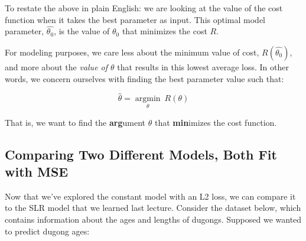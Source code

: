 \documentclass[
  letterpaper,
  DIV=11,
  numbers=noendperiod]{scrreprt}
\begin{document}
To restate the above in plain English: we are looking at the value of
the cost function when it takes the best parameter as input. This
optimal model parameter, \(\hat{\theta_0}\), is the value of
\(\theta_0\) that minimizes the cost \(R\).

For modeling purposes, we care less about the minimum value of cost,
\(R(\hat{\theta_0})\), and more about the \emph{value of \(\theta\)}
that results in this lowest average loss. In other words, we concern
ourselves with finding the best parameter value such that:

\[\hat{\theta} = \underset{\theta}{\operatorname{\arg\min}}\:R(\theta)\]

That is, we want to find the \textbf{arg}ument \(\theta\) that
\textbf{min}imizes the cost function.

\subsection{Comparing Two Different Models, Both Fit with
MSE}\label{comparing-two-different-models-both-fit-with-mse}

Now that we've explored the constant model with an L2 loss, we can
compare it to the SLR model that we learned last lecture. Consider the
dataset below, which contains information about the ages and lengths of
dugongs. Supposed we wanted to predict dugong ages:
\end{document}
